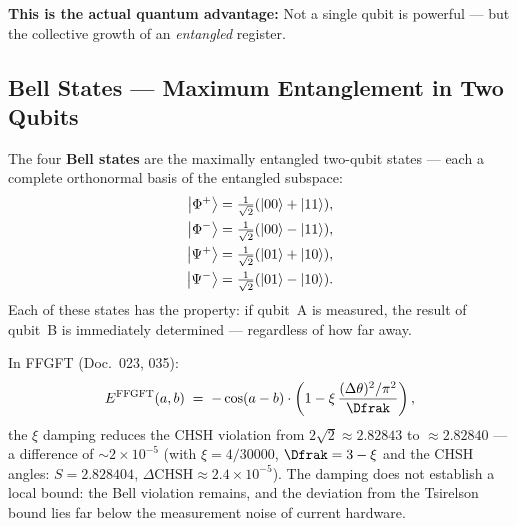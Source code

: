 \begin{center}
\end{center}

\textbf{This is the actual quantum advantage:}
Not a single qubit is powerful ---
but the collective growth of an
\emph{entangled} register.

\subsection{Bell States --- Maximum Entanglement in Two Qubits}
\label{sec:bell}

The four \textbf{Bell states} are the
maximally entangled two-qubit states ---
each a complete orthonormal basis
of the entangled subspace:
\begin{align}
  \left|\Phi^+\right\rangle &= \tfrac{1}{\sqrt{2}}(\left|00\right\rangle + \left|11\right\rangle), \\
  \left|\Phi^-\right\rangle &= \tfrac{1}{\sqrt{2}}(\left|00\right\rangle - \left|11\right\rangle), \\
  \left|\Psi^+\right\rangle &= \tfrac{1}{\sqrt{2}}(\left|01\right\rangle + \left|10\right\rangle), \\
  \left|\Psi^-\right\rangle &= \tfrac{1}{\sqrt{2}}(\left|01\right\rangle - \left|10\right\rangle).
\end{align}
Each of these states has the property:
if qubit~A is measured, the result of qubit~B
is immediately determined --- regardless of how far away.

In FFGFT (Doc.~023, 035):
\begin{equation}
  E^{\text{FFGFT}}(a, b) \;=\;
  -\cos(a - b) \cdot
  \left(1 - \xi\,\frac{(\Delta\theta)^2/\pi^2}{\Dfrak}\right),
\end{equation}
the $\xi$ damping reduces the CHSH violation from
$2\sqrt{2} \approx 2.82843$ to
$\approx 2.82840$ --- a difference of
$\sim 2\times10^{-5}$ (with $\xi = 4/30000$, $\Dfrak = 3 - \xi$ and the CHSH angles: $S = 2.828404$, $\Delta\text{CHSH} \approx 2.4\times10^{-5}$).
The damping does not establish a local bound: the Bell violation remains, and the deviation from the Tsirelson bound lies far below the measurement noise of current hardware.

